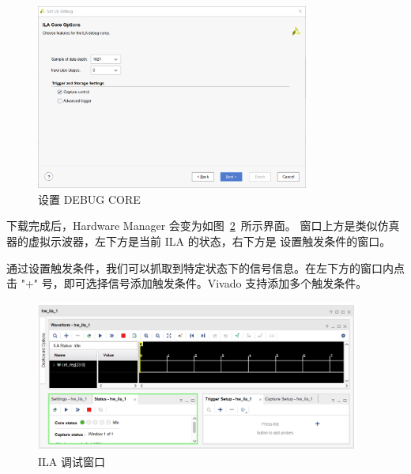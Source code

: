 \documentclass[ichigo,normal,cn]{elegantnote_mod}
\begin{document}
\begin{center}
\end{center}

\begin{figure}[!htbp]
    \centering
    \includegraphics[width=0.8\textwidth]{fig/ILA3}
    \caption{设置 DEBUG CORE}
    \label{fig:ILA3}
\end{figure}

下载完成后，Hardware Manager 会变为如图~\ref{fig:ILA4}~所示界面。
窗口上方是类似仿真器的虚拟示波器，左下方是当前 ILA 的状态，右下方是
设置触发条件的窗口。

通过设置触发条件，我们可以抓取到特定状态下的信号信息。在左下方的窗口内点击
"+" 号，即可选择信号添加触发条件。Vivado 支持添加多个触发条件。

\begin{figure}[!htbp]
    \centering
    \includegraphics[width=0.95\textwidth]{fig/ILA4}
    \caption{ILA 调试窗口}
    \label{fig:ILA4}
\end{figure}
\end{document}
